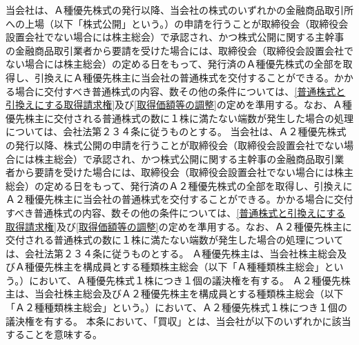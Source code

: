 \documentclass[10pt,a4paper,uplatex]{jsarticle}
\begin{document}
当会社は、Ａ種優先株式の発行以降、当会社の株式のいずれかの金融商品取引所への上場（以下「株式公開」という。）の申請を行うことが取締役会（取締役会設置会社でない場合には株主総会）で承認され、かつ株式公開に関する主幹事の金融商品取引業者から要請を受けた場合には、取締役会（取締役会設置会社でない場合には株主総会）の定める日をもって、発行済のＡ種優先株式の全部を取得し、引換えにＡ種優先株主に当会社の普通株式を交付することができる。かかる場合に交付すべき普通株式の内容、数その他の条件については、\ref{普通株式と引換えにする取得請求権}及び\ref{取得価額等の調整}の定めを準用する。なお、Ａ種優先株主に交付される普通株式の数に１株に満たない端数が発生した場合の処理については、会社法第２３４条に従うものとする。
\term 当会社は、Ａ２種優先株式の発行以降、株式公開の申請を行うことが取締役会（取締役会設置会社でない場合には株主総会）で承認され、かつ株式公開に関する主幹事の金融商品取引業者から要請を受けた場合には、取締役会（取締役会設置会社でない場合には株主総会）の定める日をもって、発行済のＡ２種優先株式の全部を取得し、引換えにＡ２種優先株主に当会社の普通株式を交付することができる。かかる場合に交付すべき普通株式の内容、数その他の条件については、\ref{普通株式と引換えにする取得請求権}及び\ref{取得価額等の調整}の定めを準用する。なお、Ａ２種優先株主に交付される普通株式の数に１株に満たない端数が発生した場合の処理については、会社法第２３４条に従うものとする。
Ａ種優先株主は、当会社株主総会及びＡ種優先株主を構成員とする種類株主総会（以下「Ａ種種類株主総会」という。）において、Ａ種優先株式１株につき１個の議決権を有する。
\term Ａ２種優先株主は、当会社株主総会及びＡ２種優先株主を構成員とする種類株主総会（以下「Ａ２種種類株主総会」という。）において、Ａ２種優先株式１株につき１個の議決権を有する。
本条において、「買収」とは、当会社が以下のいずれかに該当することを意味する。
\end{document}
